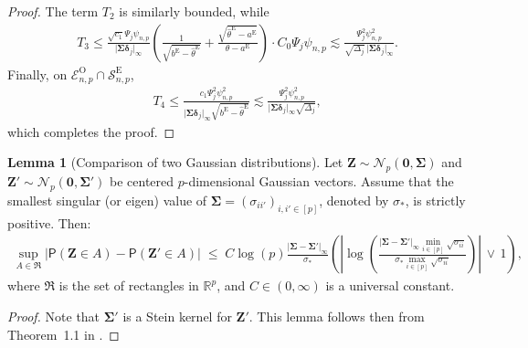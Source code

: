\documentclass[11pt, a4paper]{article}
\newcommand{\mc}{\mathcal}
\renewcommand{\l}{\left}
\renewcommand{\r}{\right}
\def\wh{\widehat}
\newcommand{\cp}{\theta}
\newcommand{\p}{\mathsf{P}}
\newcommand{\tE}{\text{E}}
\newcommand{\tO}{\text{O}}
\theoremstyle{definition}
\theoremstyle{definition}
\theoremstyle{definition}
\newtheorem{lem}[thm]{Lemma}
\theoremstyle{definition}
\theoremstyle{definition}
\theoremstyle{remark}
\theoremstyle{definition}
\theoremstyle{definition}
\theoremstyle{definition}
\begin{document}
\begin{proof}
	The term $T_2$ is similarly bounded, while
	\begin{align*}
	T_3 \le 
	\frac{\sqrt{c_1}\Psi_j\psi_{n,p}}{\vert \bm\Sigma \bm\delta_j \vert_\infty}
	\l( \frac{1}{\sqrt{b^{\tE} - \wh\cp^{\tE}}} + \frac{\sqrt{\wh\cp^{\tE} - a^{\tE}}}{\cp - a^{\tE}} \r) \cdot C_0 \Psi_j \psi_{n, p}
	\lesssim \frac{\Psi_j^2 \psi_{n, p}^2}{\sqrt{\Delta_j} \,\vert \bm\Sigma \bm\delta_j \vert_\infty}.
	\end{align*}
	Finally, on $\mc E^{\tO}_{n, p} \cap \mc S^{\tE}_{n, p}$,
	\begin{align*}
	T_4 \le \frac{c_1 \Psi_j^2 \psi_{n, p}^2}{\vert \bm\Sigma \bm\delta_j \vert_\infty \sqrt{b^{\tE} - \wh\cp^{\tE}}} \lesssim \frac{ \Psi_j^2 \psi_{n, p}^2}{\vert \bm\Sigma \bm\delta_j \vert_\infty\sqrt{\Delta_j}},
	\end{align*}
	which completes the proof.
\end{proof}

\begin{lem}[Comparison of two Gaussian distributions]\label{lem:gausscmp}
	Let $\bm Z \sim \mathcal{N}_p(\bm 0, \bm \Sigma)$ and $\bm Z' \sim \mathcal{N}_p(\bm 0, \bm \Sigma')$ be centered $p$-dimensional Gaussian vectors. Assume that  the smallest singular (or eigen) value of $\bm \Sigma = (\sigma_{ii'})_{i,i'\in [p]}$, denoted by $\sigma_*$, is strictly positive. Then:
	\begin{align*}
	\sup_{A \in \mathfrak{R}}\l\vert\p(\bm Z \in A) - \p(\bm Z' \in A)\r\vert \;\le\; C\log(p)\frac{\vert\bm\Sigma - \bm\Sigma'\vert_{\infty}}{\sigma_*}\l(\l\vert\log\l(\frac{\vert\bm\Sigma - \bm\Sigma'\vert_{\infty}\min_{i\in[p]}\sqrt{\sigma_{ii}}}{\sigma_*\max_{i\in[p]}\sqrt{\sigma_{ii}}}\r)\r\vert\,\vee\,1\r),
	\end{align*}
	where $\mathfrak{R}$ is the set of rectangles in $\mathbb R^p$, and $C \in (0, \infty)$ is a universal constant. 
\end{lem}

\begin{proof}
	Note that $\bm\Sigma'$ is a Stein kernel for $\bm Z'$. This lemma follows then from Theorem~1.1 in \citet{FaKo21}.
\end{proof}
\end{document}
